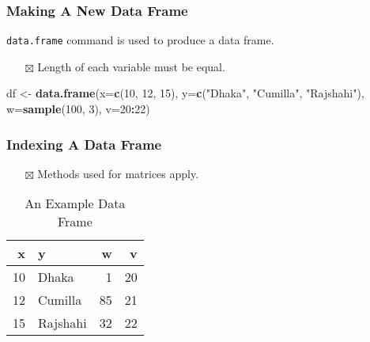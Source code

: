\documentclass[
]{book}
\newenvironment{Shaded}{\begin{snugshade}}{\end{snugshade}}
\newcommand{\DataTypeTok}[1]{\textcolor[rgb]{0.13,0.29,0.53}{#1}}
\newcommand{\DecValTok}[1]{\textcolor[rgb]{0.00,0.00,0.81}{#1}}
\newcommand{\KeywordTok}[1]{\textcolor[rgb]{0.13,0.29,0.53}{\textbf{#1}}}
\newcommand{\NormalTok}[1]{#1}
\newcommand{\OperatorTok}[1]{\textcolor[rgb]{0.81,0.36,0.00}{\textbf{#1}}}
\newcommand{\StringTok}[1]{\textcolor[rgb]{0.31,0.60,0.02}{#1}}
\providecommand{\tightlist}{%
  \setlength{\itemsep}{0pt}\setlength{\parskip}{0pt}}
\begin{document}
\hypertarget{making-a-new-data-frame}{%
\subsubsection{Making A New Data Frame}\label{making-a-new-data-frame}}

\texttt{data.frame} command is used to produce a data frame.

\begin{itemize}
\tightlist
\item[$\boxtimes$]
  Length of each variable must be equal.
\end{itemize}

\begin{Shaded}
\begin{Highlighting}[]
\NormalTok{df <-}\StringTok{ }\KeywordTok{data.frame}\NormalTok{(}\DataTypeTok{x=}\KeywordTok{c}\NormalTok{(}\DecValTok{10}\NormalTok{, }\DecValTok{12}\NormalTok{, }\DecValTok{15}\NormalTok{),}
                 \DataTypeTok{y=}\KeywordTok{c}\NormalTok{(}\StringTok{"Dhaka"}\NormalTok{, }\StringTok{"Cumilla"}\NormalTok{, }\StringTok{"Rajshahi"}\NormalTok{),}
                 \DataTypeTok{w=}\KeywordTok{sample}\NormalTok{(}\DecValTok{100}\NormalTok{, }\DecValTok{3}\NormalTok{),}
                 \DataTypeTok{v=}\DecValTok{20}\OperatorTok{:}\DecValTok{22}\NormalTok{)}
\end{Highlighting}
\end{Shaded}

\hypertarget{indexing-a-data-frame}{%
\subsubsection{Indexing A Data Frame}\label{indexing-a-data-frame}}

\begin{itemize}
\tightlist
\item[$\boxtimes$]
  Methods used for matrices apply.
\end{itemize}

\begin{table}

\caption{\label{tab:df}An Example Data Frame}
\centering
\begin{tabular}[t]{r|l|r|r}
\hline
x & y & w & v\\
\hline
10 & Dhaka & 1 & 20\\
\hline
12 & Cumilla & 85 & 21\\
\hline
15 & Rajshahi & 32 & 22\\
\hline
\end{tabular}
\end{table}
\end{document}
